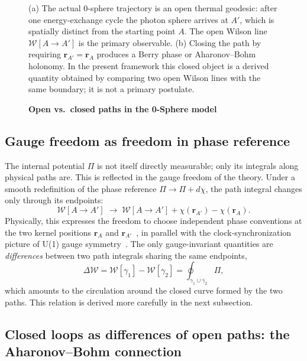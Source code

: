 \documentclass[%
 reprint, amsmath,amssymb, aps, prb, ]{revtex4-2}
\numberwithin{equation}{section}
\newcommand{\WL}{\mathcal{W}}
\begin{document}
\begin{figure}[t]
\centering

\caption{\textbf{Open vs.\ closed paths in the 0-Sphere model}}
\label{fig:paths}
\vspace{0.4em}
\begin{minipage}{0.95\textwidth}
\justifying\small
(a) The actual 0-sphere trajectory is an open thermal geodesic: after one energy-exchange cycle the photon sphere arrives at $A'$, which is spatially distinct from the starting point $A$. The open Wilson line $\WL[A\to A']$ is the primary observable. (b) Closing the path by requiring $\mathbf{r}_{A'}=\mathbf{r}_A$ produces a Berry phase or Aharonov--Bohm holonomy. In the present framework this closed object is a derived quantity obtained by comparing two open Wilson lines with the same boundary; it is not a primary postulate.
\end{minipage}
\end{figure}

\subsection{Gauge freedom as freedom in phase reference}

The internal potential $\Pi$ is not itself directly measurable; only its integrals along physical paths are. This is reflected in the gauge freedom of the theory. Under a smooth redefinition of the phase reference $\Pi \to \Pi + d\chi$, the path integral changes only through its endpoints:
\begin{equation}
\WL[A\to A'] \;\to\; \WL[A\to A'] + \chi(\mathbf{r}_{A'}) - \chi(\mathbf{r}_A).
\label{eq:gauge_WL}
\end{equation}
Physically, this expresses the freedom to choose independent phase conventions at the two kernel positions $\mathbf{r}_A$ and $\mathbf{r}_{A'}$~\cite{hanamura17}, in parallel with the clock-synchronization picture of U(1) gauge symmetry~\cite{WuYang1975}. The only gauge-invariant quantities are \emph{differences} between two path integrals sharing the same endpoints,
\begin{equation}
\Delta\WL = \WL[\gamma_1] - \WL[\gamma_2]
= \oint_{\gamma_1\cup\overline{\gamma_2}} \Pi,
\label{eq:DeltaWL}
\end{equation}
which amounts to the circulation around the closed curve formed by the two paths. This relation is derived more carefully in the next subsection.

\subsection{Closed loops as differences of open paths: the Aharonov--Bohm connection}
\end{document}
